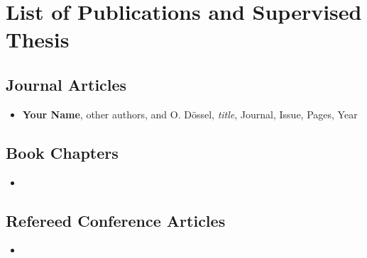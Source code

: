 \chapter*{List of Publications and Supervised Thesis}
\label{sec:Publications}

\section*{Journal Articles}
\label{sec:PublicationsJournal}

\begin{itemize}
	\item \textbf{Your Name}, other authors, and O. D\"ossel, \textit{title}, Journal, Issue, Pages, Year
\end{itemize}

\section*{Book Chapters}
\label{sec:Books}

\begin{itemize}
	\item 
\end{itemize}


\section*{Refereed Conference Articles}
\label{sec:PublicationsConferences}

\begin{itemize}
	\item 
\end{itemize}

